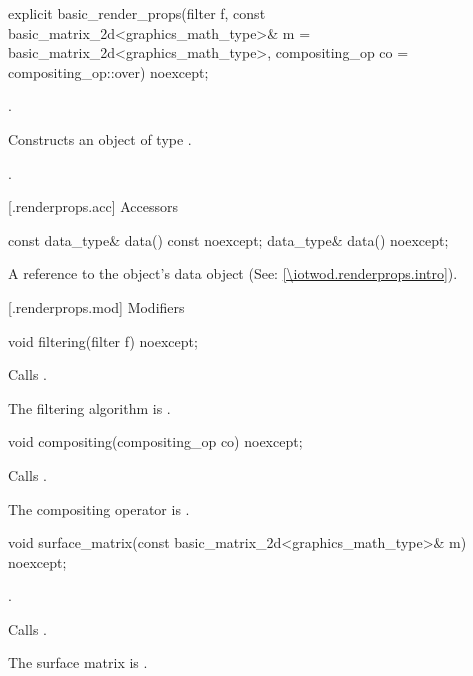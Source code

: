 %
\begin{itemdecl}
explicit basic_render_props(filter f,
  const basic_matrix_2d<graphics_math_type>& m = basic_matrix_2d<graphics_math_type>{},
  compositing_op co = compositing_op::over) noexcept;
\end{itemdecl}
\begin{itemdescr}
\pnum
\requires
{}.

\pnum
\effects
Constructs an object of type .

\pnum
\postconditions
{}.
\end{itemdescr}

 [\iotwod.renderprops.acc] {Accessors}

%
\begin{itemdecl}
const data_type& data() const noexcept;
data_type& data() noexcept;
\end{itemdecl}
\begin{itemdescr}
\pnum
\returns A reference to the  object's data object (See: \ref{\iotwod.renderprops.intro}).
\end{itemdescr}

 [\iotwod.renderprops.mod] {Modifiers}

%
\begin{itemdecl}
void filtering(filter f) noexcept;
\end{itemdecl}
\begin{itemdescr}
\pnum
\effects
Calls .

\remarks
The filtering algorithm is .
\end{itemdescr}

%
\begin{itemdecl}
void compositing(compositing_op co) noexcept;
\end{itemdecl}
\begin{itemdescr}
\pnum
\effects
Calls .

\remarks
The compositing operator is .
\end{itemdescr}

%
\begin{itemdecl}
void surface_matrix(const basic_matrix_2d<graphics_math_type>& m) noexcept;
\end{itemdecl}
\begin{itemdescr}
\pnum
\requires
{}.

\pnum
\effects
Calls .

\pnum
\remarks
The surface matrix is .
\end{itemdescr}

